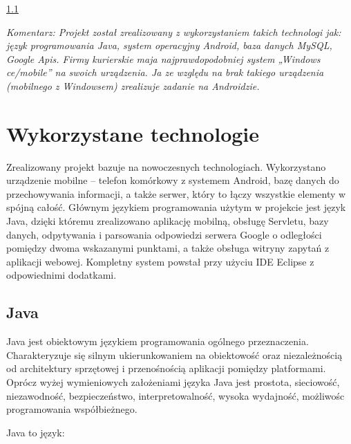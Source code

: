 \documentclass[eng,printmode,oneside]{mgr}
\begin{document}
\ref{}


\emph{\color{komentarz}
Komentarz: Projekt został zrealizowany z wykorzystaniem takich
technologi jak: język programowania Java, system operacyjny Android, baza danych
MySQL, Google Apis. Firmy kurierskie maja najprawdopodobniej system „Windows
ce/mobile” na swoich urządzenia. Ja ze względu na brak takiego urządzenia
(mobilnego z Windowsem) zrealizuje zadanie na Androidzie.
}

\chapter{Wykorzystane technologie}

Zrealizowany projekt bazuje na nowoczesnych technologiach.
Wykorzystano urządzenie mobilne -- telefon komórkowy z systemem
Android, bazę danych do przechowywania informacji, a także serwer, który to
łączy wszystkie elementy w spójną całość. Głównym językiem
programowania użytym w projekcie jest język Java, dzięki któremu
zrealizowano aplikację mobilną, obsługę Servletu, bazy danych, odpytywania i
parsowania odpowiedzi serwera Google o odległości pomiędzy dwoma wskazanymi
punktami, a także obsługa witryny zapytań z aplikacji webowej. Kompletny system
powstał przy użyciu IDE Eclipse z odpowiednimi dodatkami.

\section{Java}

Java jest obiektowym językiem programowania ogólnego przeznaczenia.
Charakteryzuje się silnym ukierunkowaniem na obiektowość oraz niezależnością od
architektury sprzętowej i przenośnością aplikacji pomiędzy platformami.
Oprócz wyżej wymieniowych założeniami języka Java jest prostota, sieciowość,
niezawodność, bezpieczeństwo, interpretowalność, wysoka wydajność, możliwośc
programowania współbieżnego.

Java to język:
\end{document}
